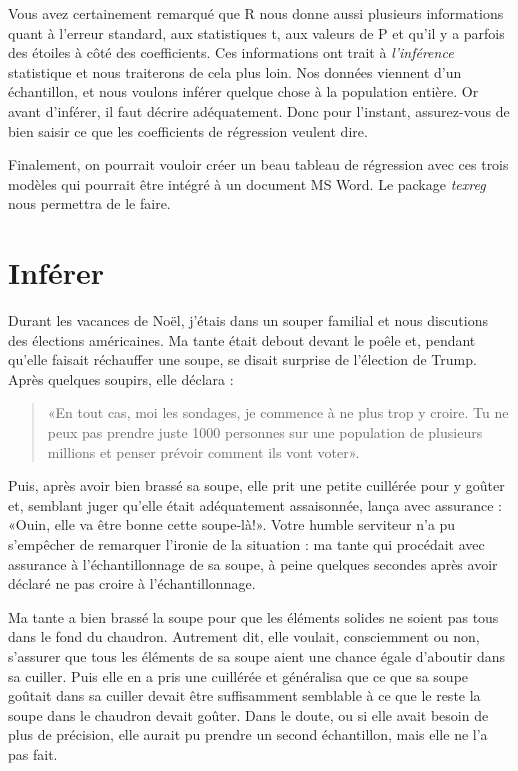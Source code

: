 \documentclass[
]{book}
\begin{document}
Vous avez certainement remarqué que R nous donne aussi plusieurs informations quant à l'erreur standard, aux statistiques t, aux valeurs de P et qu'il y a parfois des étoiles à côté des coefficients. Ces informations ont trait à \emph{l'inférence} statistique et nous traiterons de cela plus loin. Nos données viennent d'un échantillon, et nous voulons inférer quelque chose à la population entière. Or avant d'inférer, il faut décrire adéquatement. Donc pour l'instant, assurez-vous de bien saisir ce que les coefficients de régression veulent dire.

Finalement, on pourrait vouloir créer un beau tableau de régression avec ces trois modèles qui pourrait être intégré à un document MS Word. Le package \emph{texreg} nous permettra de le faire.

\hypertarget{infuxe9rer}{%
\chapter{Inférer}\label{infuxe9rer}}

Durant les vacances de Noël, j'étais dans un souper familial et nous discutions des élections américaines. Ma tante était debout devant le poêle et, pendant qu'elle faisait réchauffer une soupe, se disait surprise de l'élection de Trump. Après quelques soupirs, elle déclara :

\begin{quote}
«En tout cas, moi les sondages, je commence à ne plus trop y croire. Tu ne peux pas prendre juste 1000 personnes sur une population de plusieurs millions et penser prévoir comment ils vont voter».
\end{quote}

Puis, après avoir bien brassé sa soupe, elle prit une petite cuillérée pour y goûter et, semblant juger qu'elle était adéquatement assaisonnée, lança avec assurance : «Ouin, elle va être bonne cette soupe-là!». Votre humble serviteur n'a pu s'empêcher de remarquer l'ironie de la situation : ma tante qui procédait avec assurance à l'échantillonnage de sa soupe, à peine quelques secondes après avoir déclaré ne pas croire à l'échantillonnage.

Ma tante a bien brassé la soupe pour que les éléments solides ne soient pas tous dans le fond du chaudron. Autrement dit, elle voulait, consciemment ou non, s'assurer que tous les éléments de sa soupe aient une chance égale d'aboutir dans sa cuiller. Puis elle en a pris une cuillérée et généralisa que ce que sa soupe goûtait dans sa cuiller devait être suffisamment semblable à ce que le reste la soupe dans le chaudron devait goûter. Dans le doute, ou si elle avait besoin de plus de précision, elle aurait pu prendre un second échantillon, mais elle ne l'a pas fait.
\end{document}
